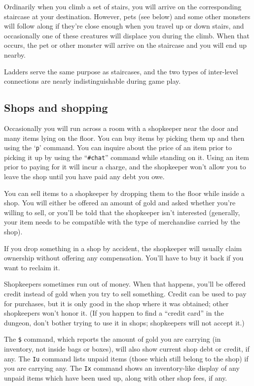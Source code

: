 Ordinarily when you climb a set of stairs, you will arrive on the
corresponding staircase at your destination.  However, pets (see below)
and some other monsters will follow along if they're close enough when
you travel up or down stairs, and occasionally one of these creatures
will displace you during the climb.  When that occurs, the pet or other
monster will arrive on the staircase and you will end up nearby.

Ladders serve the same purpose as staircases, and the two types of
inter-level connections are nearly indistinguishable during game play.

\subsection*{Shops and shopping}

Occasionally you will run across a room with a shopkeeper near the door
and many items lying on the floor.  You can buy items by picking them
up and then using the `{\tt p}' command.  You can inquire about the price
of an item prior to picking it up by using the ``{\tt \#chat}'' command
while standing on it.  Using an item prior to paying for it will incur a
charge, and the shopkeeper won't allow you to leave the shop until you
have paid any debt you owe.

You can sell items to a shopkeeper by dropping them to the floor while
inside a shop.  You will either be offered an amount of gold and asked
whether you're willing to sell, or you'll be told that the shopkeeper
isn't interested (generally, your item needs to be compatible with the
type of merchandise carried by the shop).

If you drop something in a shop by accident, the shopkeeper will usually
claim ownership without offering any compensation.  You'll have to buy
it back if you want to reclaim it.

Shopkeepers sometimes run out of money.  When that happens, you'll be
offered credit instead of gold when you try to sell something.  Credit
can be used to pay for purchases, but it is only good in the shop where
it was obtained; other shopkeepers won't honor it.  (If you happen to
find a ``credit card'' in the dungeon, don't bother trying to use it in
shops; shopkeepers will not accept it.)

The {\tt \$} command, which reports the amount of gold you are carrying
(in inventory, not inside bags or boxes), will also show current shop
debt or credit, if any.  The {\tt Iu} command lists unpaid items
(those which still belong to the shop) if you are carrying any.
The {\tt Ix} command shows an inventory-like display of any unpaid
items which have been used up, along with other shop fees, if any.


